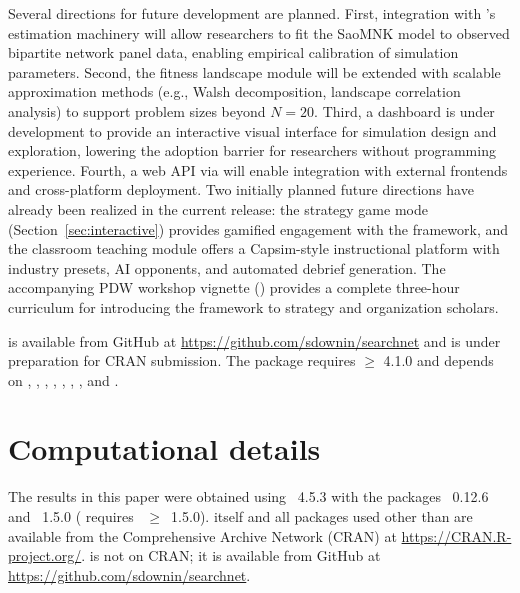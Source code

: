 \documentclass[
  article]{jss}
\begin{document}
Several directions for future development are planned. First,
integration with 's estimation machinery will allow
researchers to fit the SaoMNK model to observed bipartite network panel
data, enabling empirical calibration of simulation parameters. Second,
the fitness landscape module will be extended with scalable
approximation methods (e.g., Walsh decomposition, landscape correlation
analysis) to support problem sizes beyond \(N = 20\). Third, a
 dashboard is under development to provide an interactive
visual interface for simulation design and exploration, lowering the
adoption barrier for researchers without programming experience. Fourth,
a web API via  will enable integration with external
frontends and cross-platform deployment. Two initially planned future
directions have already been realized in the current release: the
strategy game mode (Section~\ref{sec:interactive}) provides gamified
engagement with the framework, and the classroom teaching module offers
a Capsim-style instructional platform with industry presets, AI
opponents, and automated debrief generation. The accompanying PDW
workshop vignette () provides a
complete three-hour curriculum for introducing the framework to strategy
and organization scholars.

 is available from GitHub at
\url{https://github.com/sdownin/searchnet} and is under preparation for
CRAN submission. The package requires  \(\geq\) 4.1.0 and
depends on , , , ,
, , , and .

\section{Computational details}\label{sec:compdetails}

The results in this paper were obtained using ~4.5.3 with
the packages ~0.12.6 and ~1.5.0
( requires ~\(\geq\)~1.5.0). 
itself and all packages used other than  are available
from the Comprehensive  Archive Network (CRAN) at
\url{https://CRAN.R-project.org/}.  is not on CRAN; it is
available from GitHub at \url{https://github.com/sdownin/searchnet}.


\end{document}
